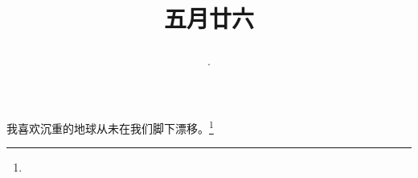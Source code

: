 \title{\date[d=1,m=7,y=2024][year:cn-y,年,month:cn,day:cn,日,·,weekday]·五月廿六 }
我喜欢沉重的地球从未在我们脚下漂移。\footnote{ }


